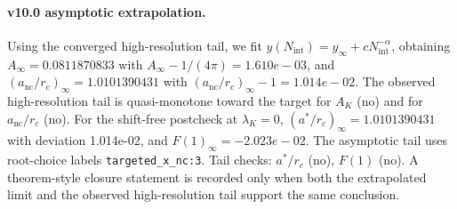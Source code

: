 \paragraph{v10.0 asymptotic extrapolation.}
Using the converged high-resolution tail, we fit $y(N_{\mathrm{int}})=y_{\infty}+cN_{\mathrm{int}}^{-\alpha}$, obtaining $A_\infty=0.0811870833$ with $A_\infty-1/(4\pi)=1.610e-03$, and $(a_{\mathrm{nc}}/r_c)_\infty=1.0101390431$ with $(a_{\mathrm{nc}}/r_c)_\infty-1=1.014e-02$. The observed high-resolution tail is quasi-monotone toward the target for $A_K$ (no) and for $a_{\mathrm{nc}}/r_c$ (no). For the shift-free postcheck at $\lambda_K=0$, $(a^*/r_c)_\infty=1.0101390431$ with deviation 1.014e-02, and $F(1)_\infty=-2.023e-02$. The asymptotic tail uses root-choice labels \texttt{targeted_x_nc:3}. Tail checks: $a^*/r_c$ (no), $F(1)$ (no). A theorem-style closure statement is recorded only when both the extrapolated limit and the
observed high-resolution tail support the same conclusion.
